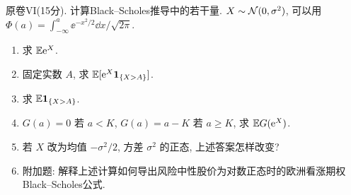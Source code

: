 \begin{exercise}\label{ex:flp-VI}
原卷VI(15分). 计算Black--Scholes推导中的若干量. $X\sim\mathcal N(0,\sigma^2)$, 可以用 $\Phi(a)=\int_{-\infty}^a\ee^{-x^2/2}\dd x/\sqrt{2\pi}$.
\begin{enumerate}
\item 求 $\mathbb E\mathrm e^X$.
\item 固定实数 $A$, 求 $\mathbb E[\mathrm e^X\mathbf 1_{\{X>A\}}]$.
\item 求 $\mathbb E\mathbf 1_{\{X>A\}}$.
\item $G(a)=0$ 若 $a<K$, $G(a)=a-K$ 若 $a\geq K$, 求 $\mathbb E G(\mathrm e^X)$.
\item 若 $X$ 改为均值 $-\sigma^2/2$, 方差 $\sigma^2$ 的正态, 上述答案怎样改变?
\item 附加题: 解释上述计算如何导出风险中性股价为对数正态时的欧洲看涨期权Black--Scholes公式.
\end{enumerate}
\end{exercise}
